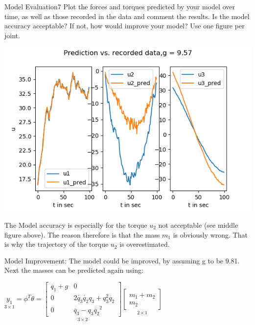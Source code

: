 \begin{questions}


\begin{question}{Model Evaluation}{7}
Plot the forces and torques predicted by your model over time, as well as those recorded in the data and comment the results. Is the model accuracy acceptable? If not, how would improve your model? Use one figure per joint.

\begin{answer}


\begin{minipage}{1\textwidth}
	\begin{center}
		\includegraphics[width=1\textwidth]{img/1f-g_wrong.png} 
	\end{center}
\end{minipage} \hfill

	The Model accuracy is especially for the torque $u_2$ not acceptable (see middle figure above). The reason therefore is that the mass $m_1$ is obviously wrong. That is why the trajectory of the torque $u_2$ is overestimated. 
	
	Model Improvement:
	The model could be improved, by assuming g to be 9.81. Next the masses can be predicted again using: 
	
		$\underset{3\times 1}{y_1}= \phi^T \theta=  \underset{3\times 2} {\begin{bmatrix}
			\ddot{q_1}+g&0\\0&2\dot{q_3}\dot{q_2}q_3+q_3^2\ddot{q_2}\\0&\ddot{q_3}-q_3 \dot{q_2}^2
			\end{bmatrix}}
	\underset{2\times 1}{\begin{bmatrix}
			m_1 +m_2\\m_2
		\end{bmatrix}}$
	

\end{answer}
\end{question}
\end{questions}
